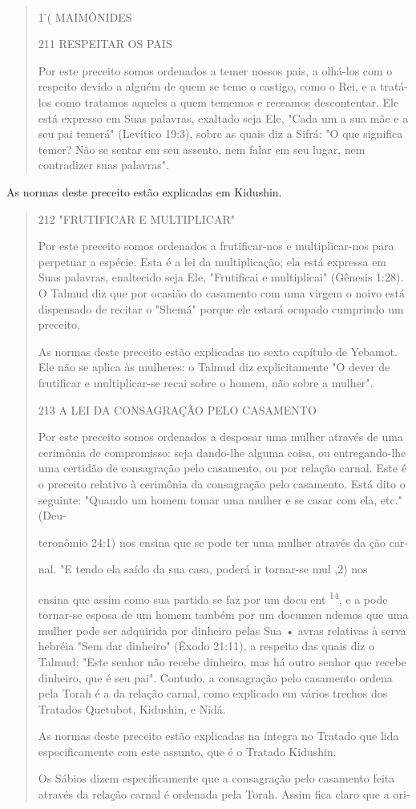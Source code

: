 \begin{quote}
1\textsuperscript{-}( MAIMÔNIDES

211 RESPEITAR OS PAIS

Por este preceito somos ordenados a temer nossos pais, a olhá-los com o
respeito devido a alguém de quem se teme o castigo, como o Rei, e a
tratá-los como tratamos aqueles a quem tememos e receamos descontentar.
Ele está expresso em Suas palavras, exaltado seja Ele, "Cada um a sua
mãe e a seu pai temerá" (Levítico 19:3), sobre as quais diz a Sifrá: "O
que significa temer? Não se sentar em seu assento, nem falar em seu
lugar, nem contradizer suas palavras".
\end{quote}

As normas deste preceito estão explicadas em Kidushin.

\begin{quote}
212 "FRUTIFICAR E MULTIPLICAR"

Por este preceito somos ordenados a frutificar-nos e multiplicar-nos
para perpetuar a espécie. Esta é a lei da multiplicação; ela está
expressa em Suas palavras, enaltecido seja Ele, "Frutificai e
multiplicai" (Gênesis 1:28). O Talmud diz que por ocasião do casamento
com uma virgem o noivo está dispensado de recitar o "Shemá" porque ele
estará ocupado cumprindo um preceito.

As normas deste preceito estão explicadas no sexto capítulo de Ye­bamot.
Ele não se aplica às mulheres: o Talmud diz explicitamente "O dever de
frutificar e multiplicar-se recai sobre o homem, não sobre a mulher".

213 A LEI DA CONSAGRAÇÃO PELO CASAMENTO

Por este preceito somos ordenados a desposar uma mulher através de uma
cerimônia de compromisso: seja dando-lhe alguma coisa, ou entregando-lhe
uma certidão de consagração pelo casamento, ou por relação carnal. Este
é o preceito relativo à cerimônia da consagração pelo casamento. Está
dito o seguinte: "Quando um homem tomar uma mulher e se casar com ela,
etc." (Deu-

teronômio 24:1) nos ensina que se pode ter uma mulher através da ção
car-

nal. "E tendo ela saído da sua casa, poderá ir tornar-se mul ,2) nos

ensina que assim como sua partida se faz por um docu ent
\textsuperscript{14}, e a pode tornar-se esposa de um homem também por
um documen ndemos que uma mulher pode ser adquirida por dinheiro pelas
Sua • avras relativas à serva hebréia "Sem dar dinheiro" (Êxodo 21:11),
a respeito das quais diz o Talmud: "Este senhor não recebe dinheiro, mas
há outro senhor que recebe dinheiro, que é seu pai". Contudo, a
consagração pelo casamento ordena pela Torah é a da relação carnal, como
explicado em vários trechos dos Tratados Quetubot, Kidushin, e Nidá.

As normas deste preceito estão explicadas na íntegra no Tratado que lida
especificamente com este assunto, que é o Tratado Kidushin.

Os Sábios dizem especificamente que a consagração pelo casamento feita
através da relação carnal é ordenada pela Torah. Assim fica claro que a
ori-
\end{quote}

